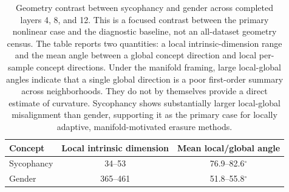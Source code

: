 \begin{table}[t]
\centering
\caption{Geometry contrast between sycophancy and gender across completed layers 4, 8, and 12. This is a focused contrast between the primary nonlinear case and the diagnostic baseline, not an all-dataset geometry census. The table reports two quantities: a local intrinsic-dimension range and the mean angle between a global concept direction and local per-sample concept directions. Under the manifold framing, large local-global angles indicate that a single global direction is a poor first-order summary across neighborhoods. They do not by themselves provide a direct estimate of curvature. Sycophancy shows substantially larger local-global misalignment than gender, supporting it as the primary case for locally adaptive, manifold-motivated erasure methods.}
\label{tab:geometry_contrast_summary}
\small
\begin{tabular}{lcc}
\toprule
Concept & Local intrinsic dimension & Mean local/global angle \\
\midrule
Sycophancy & 34--53 & 76.9--82.6$^\circ$ \\
Gender & 365--461 & 51.8--55.8$^\circ$ \\
\bottomrule
\end{tabular}
\end{table}
